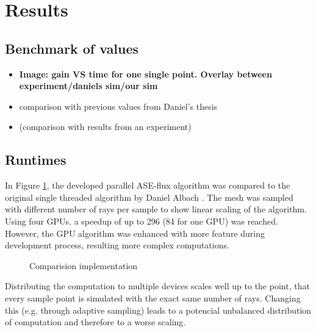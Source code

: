 \section{Results}

\subsection{Benchmark of values}

\begin{itemize}

  \item \textbf{Image: gain VS time for one single point. Overlay between
    experiment/daniels sim/our sim}

  \item comparison with previous values from Daniel's thesis

  \item (comparison with results from an experiment)

\end{itemize}



\subsection{Runtimes}
In Figure \ref{plot:runtime}, the developed parallel ASE-flux algorithm was compared to 
the original single threaded algorithm by Daniel Albach
\cite{ASE2010}. The mesh was sampled with different number of rays per sample
to show linear scaling of the algorithm. Using four GPUs, a speedup of up to 
296 (84 for one GPU) was reached. However, the GPU algorithm was enhanced with
more feature during development process, resulting more complex computations.
\begin{figure}[H]
  \centerline{
    }
  \caption{Comparision implementation}
  \label{plot:runtime}
\end{figure}
Distributing the computation to multiple devices scales well up to the
point, that every sample point is simulated with the exact same number
of rays. Changing this (e.g. through adaptive sampling) leads to
a potencial unbalanced distribution of computation and therefore to
a worse scaling.

